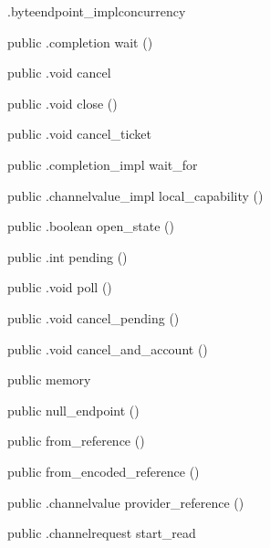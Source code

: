 \begin{CrexxClass}{.byteendpoint\_impl}{concurrency}
\begin{Members}
    \Method
      {public}
      {.completion}
      {wait}
      {()}

    \Method
      {public}
      {.void}
      {cancel}
      {}

    \Method
      {public}
      {.void}
      {close}
      {()}

    \Method
      {public}
      {.void}
      {cancel\_ticket}
      {}

    \Method
      {public}
      {.completion\_impl}
      {wait\_for}
      {}

    \Method
      {public}
      {.channelvalue\_impl}
      {local\_capability}
      {()}

    \Method
      {public}
      {.boolean}
      {open\_state}
      {()}

    \Method
      {public}
      {.int}
      {pending}
      {()}

    \Method
      {public}
      {.void}
      {poll}
      {()}

    \Method
      {public}
      {.void}
      {cancel\_pending}
      {()}

    \Method
      {public}
      {.void}
      {cancel\_and\_account}
      {()}

    \Factory
      {public}
      {memory}
      {}

    \Factory
      {public}
      {null\_endpoint}
      {()}

    \Factory
      {public}
      {from\_reference}
      {()}

    \Factory
      {public}
      {from\_encoded\_reference}
      {()}

    \Method
      {public}
      {.channelvalue}
      {provider\_reference}
      {()}

    \Method
      {public}
      {.channelrequest}
      {start\_read}
      {}


\end{Members}
\end{CrexxClass}
